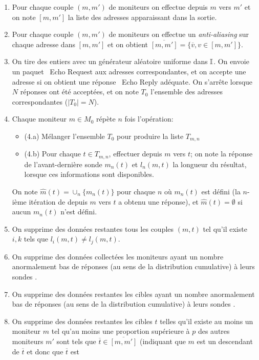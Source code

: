 \begin{enumerate}
\item Pour chaque couple $(m, m')$ de moniteurs on effectue \traceroute depuis
$m$ vers $m'$ et on note $[m, m']$ la liste des adresses apparaissant dans la
sortie.
\item Pour chaque couple $(m, m')$ de moniteurs on effectue un {\em
anti-aliasing} sur chaque adresse dans $[m, m']$ et on obtient $\overline{[m,
m']} = \{ \overline{v}, v \in [m, m'] \}$.
\item On tire des entiers avec un générateur aléatoire uniforme dans $\mathbb{I}$.
On envoie un paquet \icmp~{\sc Echo Request} aux adresses correspondantes, et on
accepte une adresse si on obtient une réponse \icmp~{\sc Echo Reply} adéquate.
On s'arrête lorsque $N$ réponses ont été acceptées, et on note $T_0$ l'ensemble
des adresses correspondantes ($|T_0| = N$).
\item Chaque moniteur $m \in M_0$ répète $n$ fois l'opération:
	\begin{itemize}
	  \item (4.a) Mélanger l'ensemble $T_0$ pour produire la liste $T_{m,n}$
	  \item (4.b) Pour chaque $t \in T_{m,n}$, effectuer \traceroute depuis $m$
	  vers $t$; on note la réponse de l'avant-dernière sonde $m_n(t)$ et $l_n(m, t)$ la
	  longueur du résultat, lorsque ces informations sont disponibles.
	\end{itemize}
On note $\hat{m}(t) = \cup_{n} \{ m_n(t) \}$ pour chaque $n$ où $m_n(t)$ est
défini (la $n$-ième itération de \traceroute depuis $m$ vers $t$ a obtenu une
réponse), et $\hat{m}(t) = \emptyset$ si aucun $m_n(t)$ n'est défini.
\item On supprime des données restantes tous les couples $(m, t)$ tel qu'il
existe $i,k$ tels que $l_i(m, t) \neq l_j(m, t)$.
\item On supprime des données collectées les moniteurs ayant un nombre
anormalement bas de réponses (au sens de la distribution cumulative) à leurs
sondes \traceroute.
\item On supprime des données restantes les cibles ayant un nombre anormalement
bas de réponses (au sens de la distribution cumulative) à leurs sondes
\traceroute.
\item On supprime des données restantes les cibles $t$ telles qu'il
existe au moins un moniteur $m$ tel qu'au moins une proportion supérieure à $p$ des autres
moniteurs $m'$ sont tels que $\overline{t} \in \overline{[m, m']}$ (indiquant
que $m$ est un descendant de $\overline{t}$ et donc que $\overline{t}$ est

\end{enumerate}
